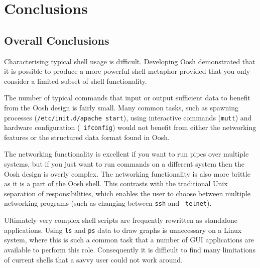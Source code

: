 \documentclass[12pt,twoside,notitlepage]{report}
\begin{document}

\cleardoublepage
\chapter{Conclusions}


\section{Overall Conclusions}
Characterising typical shell usage is difficult. Developing Oosh
demonstrated that it is possible to produce a more powerful shell
metaphor provided that you only consider a limited subset of shell
functionality. 

The number of typical commands that input or output sufficient data to
benefit from the Oosh design is fairly small. Many common tasks, such
as spawning processes ({\tt /etc/init.d/apache start}), using
interactive commands ({\tt mutt}) and hardware configuration ({\tt
  ifconfig}) would not benefit from either the networking features or
the structured data format found in Oosh.

The networking functionality is excellent if you want to run pipes
over multiple systems, but if you just want to run commands on a
different system then the Oosh design is overly complex. The
networking functionality is also more brittle as it is a part of the
Oosh shell. This contrasts with the traditional Unix separation of
responsibilities, which enables the user to choose between multiple
networking programs (such as changing between {\tt ssh} and {\tt
  telnet}).

Ultimately very complex shell scripts are frequently rewritten as
standalone applications. Using {\tt ls} and {\tt ps} data to draw
graphs is unnecessary on a Linux system, where this is such a common
task that a number of GUI applications are available to perform this
role. Consequently it is difficult to find many limitations of current
shells that a savvy user could not work around.
\end{document}
